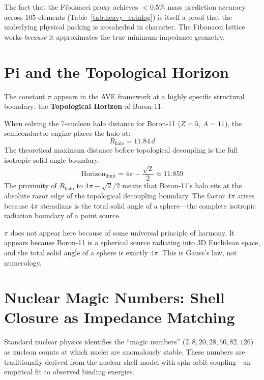 The fact that the Fibonacci proxy achieves $<0.5\%$ mass prediction accuracy across 105 elements (Table~\ref{tab:heavy_catalog}) is itself a proof that the underlying physical packing is icosahedral in character. The Fibonacci lattice works \textit{because} it approximates the true minimum-impedance geometry.

\section{Pi and the Topological Horizon}
\label{sec:pi_horizon}

The constant $\pi$ appears in the AVE framework at a highly specific structural boundary: the \textbf{Topological Horizon} of Boron-11.

When solving the 7-nucleon halo distance for Boron-11 ($Z=5$, $A=11$), the semiconductor engine places the halo at:
\begin{equation}
    R_{\text{halo}} = 11.84\,d
\end{equation}
The theoretical maximum distance before topological decoupling is the full isotropic solid angle boundary:
\begin{equation}
    \text{Horizon}_{\text{limit}} = 4\pi - \frac{\sqrt{2}}{2} \approx 11.859
\end{equation}
The proximity of $R_{\text{halo}}$ to $4\pi - \sqrt{2}/2$ means that Boron-11's halo sits at the absolute razor edge of the topological decoupling boundary. The factor $4\pi$ arises because $4\pi$ steradians is the total solid angle of a sphere---the complete isotropic radiation boundary of a point source.

$\pi$ does not appear here because of some universal principle of harmony. It appears because Boron-11 is a spherical source radiating into 3D Euclidean space, and the total solid angle of a sphere is exactly $4\pi$. This is Gauss's law, not numerology.

\section{Nuclear Magic Numbers: Shell Closure as Impedance Matching}
\label{sec:magic_numbers}

Standard nuclear physics identifies the ``magic numbers'' ($2, 8, 20, 28, 50, 82, 126$) as nucleon counts at which nuclei are anomalously stable. These numbers are traditionally derived from the nuclear shell model with spin-orbit coupling---an empirical fit to observed binding energies.


